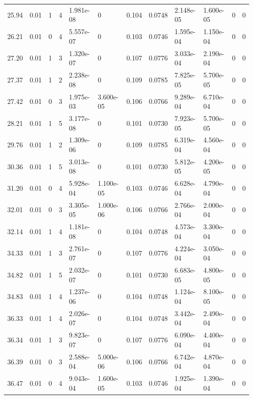 \documentclass[preview]{standalone}
\begin{document}
{{{\begin{tabular}{L{1.2cm}C{1.2cm} C{0.3cm}C{0.5cm} C{1.4cm}C{1.4cm} C{1.4cm}C{1.4cm} C{1.6cm}C{1.6cm} C{1.6cm}C{1.6cm}}
  25.94  &  0.01  & 1     &  4 &  1.981e-08  & 0  &  0.104&   0.0748& 2.148e-05 & 1.600e-05   &  0 & 0  \\ 
  26.21  &  0.01  & 0     &  4 &  5.557e-07  & 0  &  0.103&   0.0746& 1.595e-04 & 1.150e-04   &  0 & 0  \\ 
  27.20  &  0.01  & 1     &  3 &  1.320e-07  & 0  &  0.107&   0.0776& 3.033e-04 & 2.190e-04   &  0 & 0  \\ 
  27.37  &  0.01  & 1     &  2 &  2.238e-08  & 0  &  0.109&   0.0785& 7.825e-05 & 5.700e-05   &  0 & 0  \\ 
  27.42  &  0.01  & 0     &  3 &  1.975e-03  & 3.600e-05  &  0.106&   0.0766& 9.289e-04 & 6.710e-04   &  0 & 0  \\ 
  28.21  &  0.01  & 1     &  5 &  3.177e-08  & 0  &  0.101&   0.0730& 7.923e-05 & 5.700e-05   &  0 & 0  \\ 
  29.76  &  0.01  & 1     &  2 &  1.309e-06  & 0  &  0.109&   0.0785& 6.319e-04 & 4.560e-04   &  0 & 0  \\ 
  30.36  &  0.01  & 1     &  5 &  3.013e-08  & 0  &  0.101&   0.0730& 5.812e-05 & 4.200e-05   &  0 & 0  \\ 
  31.20  &  0.01  & 0     &  4 &  5.928e-04  & 1.100e-05  &  0.103&   0.0746& 6.628e-04 & 4.790e-04   &  0 & 0  \\ 
  32.01  &  0.01  & 0     &  3 &  3.305e-05  & 1.000e-06  &  0.106&   0.0766& 2.766e-04 & 2.000e-04   &  0 & 0  \\ 
  32.14  &  0.01  & 1     &  4 &  1.181e-08  & 0  &  0.104&   0.0748& 4.573e-04 & 3.300e-04   &  0 & 0  \\ 
  34.33  &  0.01  & 1     &  3 &  2.761e-07  & 0  &  0.107&   0.0776& 4.224e-04 & 3.050e-04   &  0 & 0  \\ 
  34.82  &  0.01  & 1     &  5 &  2.032e-07  & 0  &  0.101&   0.0730& 6.683e-05 & 4.800e-05   &  0 & 0  \\ 
  34.83  &  0.01  & 1     &  4 &  1.237e-06  & 0  &  0.104&   0.0748& 1.124e-04 & 8.100e-05   &  0 & 0  \\ 
  36.33  &  0.01  & 1     &  4 &  2.026e-07  & 0  &  0.104&   0.0748& 3.442e-04 & 2.490e-04   &  0 & 0  \\ 
  36.34  &  0.01  & 1     &  3 &  9.823e-07  & 0  &  0.107&   0.0776& 6.090e-04 & 4.400e-04   &  0 & 0  \\ 
  36.39  &  0.01  & 0     &  3 &  2.588e-04  & 5.000e-06  &  0.106&   0.0766& 6.742e-04 & 4.870e-04   &  0 & 0  \\ 
  36.47  &  0.01  & 0     &  4 &  9.043e-04  & 1.600e-05  &  0.103&   0.0746& 1.925e-04 & 1.390e-04   &  0 & 0  \\ 

\end{tabular}}}}
\end{document}
